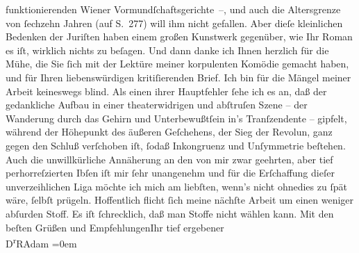 \begin{ledgroupsized}[t]{13cm}
                    funktionierenden Wiener
                    Vormundſchaftsgerichte –, und auch die Altersgrenze von ſechzehn Jahren (auf
                    S. 277) will ihm nicht gefallen. Aber dieſe kleinlichen Bedenken der Juriſten
                    haben einem großen Kunstwerk gegenüber, wie Ihr Roman es iſt, wirklich nichts zu beſagen.\pend
           \pstart
           Und dann danke ich Ihnen herzlich für die Mühe, die Sie ſich mit der Lektüre
                    meiner korpulenten Komödie
                    gemacht haben, und für Ihren liebenswürdigen kritiſierenden Brief. Ich bin für
                    die Mängel meiner Arbeit keineswegs blind. Als einen ihrer Hauptfehler ſehe ich
                    es an, daß der gedankliche Aufbau in einer theaterwidrigen und abſtruſen Szene –
                    der Wanderung durch das Gehirn {\pb}und
                    Unterbewußtſein in’s Tranſzendente – gipfelt, während der Höhepunkt des äußeren
                    Geſchehens, der Sieg der Revolun, ganz gegen den Schluß verſchoben iſt, ſodaß Inkongruenz und
                    Unſymmetrie beſtehen. Auch die unwillkürliche Annäherung an den von mir zwar
                    geehrten, aber tief perhorreſzierten Ibſen
                    iſt mir ſehr unangenehm und für die Erſchaffung dieſer unverzeihlichen Liga
                    möchte ich mich am liebſten, wenn’s nicht ohnedies zu ſpät wäre, ſelbſt
                    prügeln.\pend
           \pstart
           Hoffentlich flicht ſich meine nächſte Arbeit um einen weniger abſurden Stoff. Es
                    iſt ſchrecklich, daß man Stoffe nicht wählen kann.\pend
           \pstart
           Mit den beſten Grüßen und Empfehlungen\hspace*{1.5em}Ihr\pend
           \pstart
           tief ergebener{\\[\baselineskip]}\spacefill\mbox{D\textsuperscript{r}RAdam}\pend
           \leftskip=0em{}
         
         \endnumbering{}\end{ledgroupsized}  \newcommand{\dateiname}{L02500}\newcommand{\titel}{Robert Adam an Arthur Schnitzler, 11. 5. 1928}\newcommand{\editorInnen}{Martin Anton Müller und Gerd-Hermann Susen}
      